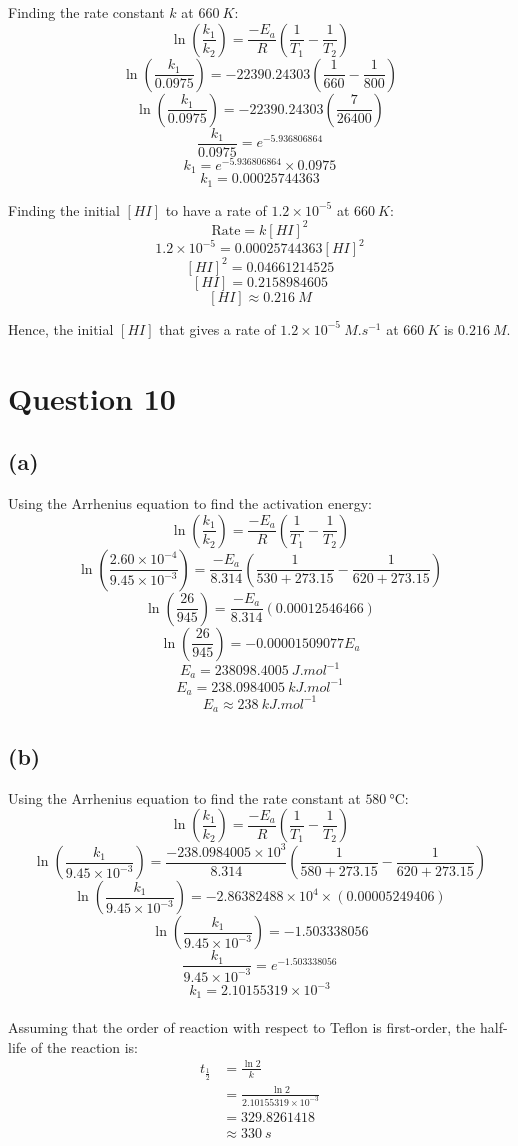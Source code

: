 \documentclass[11pt]{article}
\begin{document}
Finding the rate constant \(k\) at \(\qty{660}{\unit{K}}\):
\[\ln \left( \frac{k_1}{k_2} \right) = \frac{-E_a}{R} \left(\frac{1}{T_1} - \frac{1}{T_2} \right)\]
\[\ln \left( \frac{k_1}{0.0975} \right) = -22390.24303 \left( \frac{1}{660} - \frac{1}{800}\right)\]
\[\ln \left( \frac{k_1}{0.0975} \right) = -22390.24303 \left( \frac{7}{26400} \right)\]
\[\frac{k_1}{0.0975} = e^{-5.936806864}\]
\[k_1 = e^{-5.936806864} \times 0.0975\]
\[k_1 = 0.00025744363\]

Finding the initial \([HI]\) to have a rate of \(1.2 \times 10^{-5}\) at \(\qty{660}{\unit{K}}\):
\[\text{Rate} = k[HI]^2\]
\[1.2 \times 10^{-5} = 0.00025744363[HI]^2\]
\[[HI]^2 = 0.04661214525\]
\[[HI] = 0.2158984605\]
\[[HI] \approx \qty{0.216}{\unit{M}}\]

Hence, the initial \([HI]\) that gives a rate of \(1.2 \times 10^{-5} \ \unit{M.s^{-1}}\) at \(\qty{660}{\unit{K}}\) is \(\qty{0.216}{\unit{M}}\).


\section{Question 10}
\label{sec:org31d3966}

\subsection{(a)}
\label{sec:org128e153}

Using the Arrhenius equation to find the activation energy:
\[\ln \left( \frac{k_1}{k_2} \right) = \frac{-E_a}{R} \left(\frac{1}{T_1} - \frac{1}{T_2} \right)\]
\[\ln \left( \frac{2.60 \times 10^{-4}}{9.45 \times 10^{-3}} \right) = \frac{-E_a}{8.314} \left(\frac{1}{530 + 273.15} - \frac{1}{620 + 273.15} \right)\]
\[\ln \left( \frac{26}{945} \right) = \frac{-E_a}{8.314} (0.00012546466)\]
\[\ln \left( \frac{26}{945} \right) = -0.00001509077 E_a\]
\[E_a = \qty{238098.4005}{\unit{J.mol^{-1}}}\]
\[E_a = \qty{238.0984005}{\unit{kJ.mol^{-1}}}\]
\[E_a \approx \qty{238}{\unit{kJ.mol^{-1}}}\]

\newpage

\subsection{(b)}
\label{sec:org4af68c5}

Using the Arrhenius equation to find the rate constant at \(\qty{580}{\unit{\degreeCelsius}}\):
\[\ln \left( \frac{k_1}{k_2} \right) = \frac{-E_a}{R} \left(\frac{1}{T_1} - \frac{1}{T_2} \right)\]
\[\ln \left( \frac{k_1}{9.45 \times 10^{-3}} \right) = \frac{-238.0984005 \times 10^{3}}{8.314} \left(\frac{1}{580 + 273.15} - \frac{1}{620 + 273.15} \right)\]
\[\ln \left( \frac{k_1}{9.45 \times 10^{-3}} \right) = - 2.86382488 \times 10^{4} \times (0.00005249406)\]
\[\ln \left( \frac{k_1}{9.45 \times 10^{-3}} \right) = -1.503338056\]
\[\frac{k_1}{9.45 \times 10^{-3}} = e^{-1.503338056}\]
\[k_1 = 2.10155319 \times 10^{-3}\]
\\[0pt]

Assuming that the order of reaction with respect to Teflon is first-order, the half-life of the reaction is:
\begin{align*}
t_{\frac{1}{2}} &= \frac{\ln 2}{k} \\
&= \frac{\ln 2}{2.10155319 \times 10^{-3}} \\
&= 329.8261418 \\
&\approx \qty{330}{\unit{s}}
\end{align*}
\end{document}
